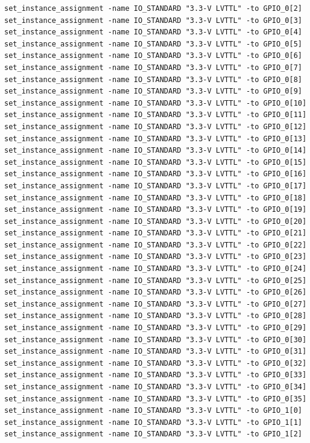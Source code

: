 \documentclass[conference]{IEEEtran}
\begin{document}
\begin{lstlisting}
set_instance_assignment -name IO_STANDARD "3.3-V LVTTL" -to GPIO_0[2]
set_instance_assignment -name IO_STANDARD "3.3-V LVTTL" -to GPIO_0[3]
set_instance_assignment -name IO_STANDARD "3.3-V LVTTL" -to GPIO_0[4]
set_instance_assignment -name IO_STANDARD "3.3-V LVTTL" -to GPIO_0[5]
set_instance_assignment -name IO_STANDARD "3.3-V LVTTL" -to GPIO_0[6]
set_instance_assignment -name IO_STANDARD "3.3-V LVTTL" -to GPIO_0[7]
set_instance_assignment -name IO_STANDARD "3.3-V LVTTL" -to GPIO_0[8]
set_instance_assignment -name IO_STANDARD "3.3-V LVTTL" -to GPIO_0[9]
set_instance_assignment -name IO_STANDARD "3.3-V LVTTL" -to GPIO_0[10]
set_instance_assignment -name IO_STANDARD "3.3-V LVTTL" -to GPIO_0[11]
set_instance_assignment -name IO_STANDARD "3.3-V LVTTL" -to GPIO_0[12]
set_instance_assignment -name IO_STANDARD "3.3-V LVTTL" -to GPIO_0[13]
set_instance_assignment -name IO_STANDARD "3.3-V LVTTL" -to GPIO_0[14]
set_instance_assignment -name IO_STANDARD "3.3-V LVTTL" -to GPIO_0[15]
set_instance_assignment -name IO_STANDARD "3.3-V LVTTL" -to GPIO_0[16]
set_instance_assignment -name IO_STANDARD "3.3-V LVTTL" -to GPIO_0[17]
set_instance_assignment -name IO_STANDARD "3.3-V LVTTL" -to GPIO_0[18]
set_instance_assignment -name IO_STANDARD "3.3-V LVTTL" -to GPIO_0[19]
set_instance_assignment -name IO_STANDARD "3.3-V LVTTL" -to GPIO_0[20]
set_instance_assignment -name IO_STANDARD "3.3-V LVTTL" -to GPIO_0[21]
set_instance_assignment -name IO_STANDARD "3.3-V LVTTL" -to GPIO_0[22]
set_instance_assignment -name IO_STANDARD "3.3-V LVTTL" -to GPIO_0[23]
set_instance_assignment -name IO_STANDARD "3.3-V LVTTL" -to GPIO_0[24]
set_instance_assignment -name IO_STANDARD "3.3-V LVTTL" -to GPIO_0[25]
set_instance_assignment -name IO_STANDARD "3.3-V LVTTL" -to GPIO_0[26]
set_instance_assignment -name IO_STANDARD "3.3-V LVTTL" -to GPIO_0[27]
set_instance_assignment -name IO_STANDARD "3.3-V LVTTL" -to GPIO_0[28]
set_instance_assignment -name IO_STANDARD "3.3-V LVTTL" -to GPIO_0[29]
set_instance_assignment -name IO_STANDARD "3.3-V LVTTL" -to GPIO_0[30]
set_instance_assignment -name IO_STANDARD "3.3-V LVTTL" -to GPIO_0[31]
set_instance_assignment -name IO_STANDARD "3.3-V LVTTL" -to GPIO_0[32]
set_instance_assignment -name IO_STANDARD "3.3-V LVTTL" -to GPIO_0[33]
set_instance_assignment -name IO_STANDARD "3.3-V LVTTL" -to GPIO_0[34]
set_instance_assignment -name IO_STANDARD "3.3-V LVTTL" -to GPIO_0[35]
set_instance_assignment -name IO_STANDARD "3.3-V LVTTL" -to GPIO_1[0]
set_instance_assignment -name IO_STANDARD "3.3-V LVTTL" -to GPIO_1[1]
set_instance_assignment -name IO_STANDARD "3.3-V LVTTL" -to GPIO_1[2]

\end{lstlisting}
\end{document}
